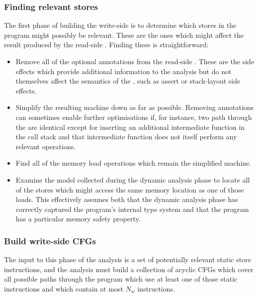 \subsubsection{Finding relevant stores}

The first phase of building the write-side \StateMachines is to determine which stores in the program might possibly be relevant.
These are the ones which might affect the result produced by the read-side \StateMachine.
Finding these is straightforward:

\begin{itemize}
\item
  Remove all of the optional annotations from the read-side \StateMachine.
  These are the side effects which provide additional information to the analysis but do not themselves affect the semantics of the \StateMachine, such as assert or stack-layout side effects.
\item
  Simplify the resulting machine down as far as possible.
  Removing annotations can sometimes enable further optimisations if, for instance, two path through the \StateMachine are identical except for inserting an additional intermediate function in the call stack and that intermediate function does not itself perform any relevant operations.
\item
  Find all of the memory load operations which remain the simplified machine.
\item
  Examine the model collected during the dynamic analysis phase to locate all of the stores which might access the same memory location as one of those loads.
  This effectively assumes both that the dynamic analysis phase has correctly captured the program's internal type system and that the program has a particular memory safety property.
\end{itemize}

\subsubsection{Build write-side CFGs}

The input to this phase of the analysis is a set of potentially relevant static store instructions, and the analysis must build a collection of acyclic CFGs which cover all possible paths through the program which use at least one of those static instructions and which contain at most $N_w$ instructions.

